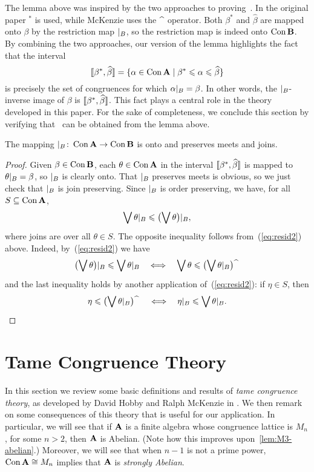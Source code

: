 The lemma above was inspired by the two approaches to
proving~\cite[Lemma~1]{Palfy:1980}.  In the original paper $^*$ is used, while
McKenzie uses the $\hatmap$ operator.  Both $\beta^*$ and
$\widehat{\beta}$ are mapped onto $\beta$ by the restriction map $|_B$, so
the restriction map is indeed onto $\operatorname{Con}\mathbf{B}$.
By combining the two approaches, our version of the lemma highlights 
the fact that the interval 
\[
\llbracket\beta^*, \widehat{\beta}\rrbracket =
\{\alpha \in \operatorname{Con}\mathbf{A} \mid \beta^* \leqslant \alpha \leqslant \widehat{\beta}\}
\]
is precisely the set of congruences for
which $\alpha|_B = \beta$.  In other words, the
$|_B$-inverse image of $\beta$ is
$\llbracket\beta^*, \widehat{\beta}\rrbracket$.
This fact plays a central role in the
theory developed in this  paper.
For the sake of completeness, we conclude this section by
verifying that~\cite[Lemma~1]{Palfy:1980} can be obtained from the lemma above.
\begin{corollary}%
[cf.~{\cite[Lemma 1]{Palfy:1980}}]
The mapping  $|_B \colon  \operatorname{Con}\mathbf{A} \rightarrow \operatorname{Con}\mathbf{B}$ is onto and preserves meets and joins.
\end{corollary}
\begin{proof}
  Given $\beta\in \operatorname{Con}\mathbf{B}$, each $\theta\in \operatorname{Con}\mathbf{A}$ in the interval 
  $\llbracket \beta^*, \widehat{\beta}\rrbracket$ is mapped to $\theta|_B = \beta$, so $|_B$ is clearly
  onto.  That $|_B$ preserves meets is obvious, so we just check that $|_B$ is
  join preserving.  Since $|_B$ is order preserving, we have, for all 
  $S \subseteq \operatorname{Con}\mathbf{A}$,
  \[
  \bigvee \theta|_B \leqslant \bigl(\bigvee \theta\bigr)|_B,
  \]
where joins are over all $\theta \in S$.  The opposite inequality follows
from~(\ref{eq:resid2}) above. Indeed, by~(\ref{eq:resid2}) we have
\[
\bigl(\bigvee \theta\bigr)|_B \leqslant \bigvee \theta|_B
\quad \Longleftrightarrow \quad
\bigvee \theta \leqslant \bigl(\bigvee \theta|_B \bigr)\!\widehat{\phantom{X}}
\]
and the last inequality holds by another application of~(\ref{eq:resid2}): if $\eta \in S$, then
\[
\eta \leqslant \bigl(\bigvee \theta|_B\bigr)\!\widehat{\phantom{X}}
\quad \Longleftrightarrow \quad
\eta|_B \leqslant \bigvee \theta|_B.
\]
\end{proof}

\section{Tame Congruence Theory}
In this section we review some basic definitions and results of \emph{tame congruence theory},
as developed by David Hobby and Ralph McKenzie in \cite{HM:1988}. 
We then remark on some consequences of this theory that is useful for our application.
In particular, we will see that if $\mathbf{A}$ is a finite algebra whose
congruence lattice is $M_n$, for some $n>2$, then $\mathbf{A}$ is Abelian. 
(Note how this improves upon~\ref{lem:M3-abelian}.)
Moreover, we will see that when $n-1$ is not a prime power, 
$\operatorname{Con} \mathbf{A} \cong M_n$ implies that $\mathbf{A}$ is \emph{strongly Abelian}.

